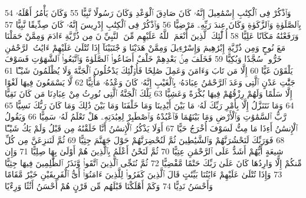 {\tiny\colorbox{cl_aya}{54}} وَٱذْكُرْ فِى ٱلْكِتَٰبِ إِسْمَٰعِيلَ إِنَّهُۥ كَانَ صَادِقَ ٱلْوَعْدِ وَكَانَ رَسُولًا نَّبِيًّا
{\tiny\colorbox{cl_aya}{55}} وَكَانَ يَأْمُرُ أَهْلَهُۥ بِٱلصَّلَوٰةِ وَٱلزَّكَوٰةِ وَكَانَ عِندَ رَبِّهِۦ مَرْضِيًّا
{\tiny\colorbox{cl_aya}{56}} وَٱذْكُرْ فِى ٱلْكِتَٰبِ إِدْرِيسَ إِنَّهُۥ كَانَ صِدِّيقًا نَّبِيًّا
{\tiny\colorbox{cl_aya}{57}} وَرَفَعْنَٰهُ مَكَانًا عَلِيًّا
{\tiny\colorbox{cl_aya}{58}} أُو۟لَٰٓئِكَ ٱلَّذِينَ أَنْعَمَ ٱللَّهُ عَلَيْهِم مِّنَ ٱلنَّبِيِّۦنَ مِن ذُرِّيَّةِ ءَادَمَ وَمِمَّنْ حَمَلْنَا مَعَ نُوحٍ وَمِن ذُرِّيَّةِ إِبْرَٰهِيمَ وَإِسْرَٰٓءِيلَ وَمِمَّنْ هَدَيْنَا وَٱجْتَبَيْنَآ إِذَا تُتْلَىٰ عَلَيْهِمْ ءَايَٰتُ ٱلرَّحْمَٰنِ خَرُّوا۟ سُجَّدًا وَبُكِيًّا
{\tiny\colorbox{cl_aya}{59}} فَخَلَفَ مِنۢ بَعْدِهِمْ خَلْفٌ أَضَاعُوا۟ ٱلصَّلَوٰةَ وَٱتَّبَعُوا۟ ٱلشَّهَوَٰتِ فَسَوْفَ يَلْقَوْنَ غَيًّا
{\tiny\colorbox{cl_aya}{60}} إِلَّا مَن تَابَ وَءَامَنَ وَعَمِلَ صَٰلِحًا فَأُو۟لَٰٓئِكَ يَدْخُلُونَ ٱلْجَنَّةَ وَلَا يُظْلَمُونَ شَيْـًٔا
{\tiny\colorbox{cl_aya}{61}} جَنَّٰتِ عَدْنٍ ٱلَّتِى وَعَدَ ٱلرَّحْمَٰنُ عِبَادَهُۥ بِٱلْغَيْبِ إِنَّهُۥ كَانَ وَعْدُهُۥ مَأْتِيًّا
{\tiny\colorbox{cl_aya}{62}} لَّا يَسْمَعُونَ فِيهَا لَغْوًا إِلَّا سَلَٰمًا وَلَهُمْ رِزْقُهُمْ فِيهَا بُكْرَةً وَعَشِيًّا
{\tiny\colorbox{cl_aya}{63}} تِلْكَ ٱلْجَنَّةُ ٱلَّتِى نُورِثُ مِنْ عِبَادِنَا مَن كَانَ تَقِيًّا
{\tiny\colorbox{cl_aya}{64}} وَمَا نَتَنَزَّلُ إِلَّا بِأَمْرِ رَبِّكَ لَهُۥ مَا بَيْنَ أَيْدِينَا وَمَا خَلْفَنَا وَمَا بَيْنَ ذَٰلِكَ وَمَا كَانَ رَبُّكَ نَسِيًّا
{\tiny\colorbox{cl_aya}{65}} رَّبُّ ٱلسَّمَٰوَٰتِ وَٱلْأَرْضِ وَمَا بَيْنَهُمَا فَٱعْبُدْهُ وَٱصْطَبِرْ لِعِبَٰدَتِهِۦ هَلْ تَعْلَمُ لَهُۥ سَمِيًّا
{\tiny\colorbox{cl_aya}{66}} وَيَقُولُ ٱلْإِنسَٰنُ أَءِذَا مَا مِتُّ لَسَوْفَ أُخْرَجُ حَيًّا
{\tiny\colorbox{cl_aya}{67}} أَوَلَا يَذْكُرُ ٱلْإِنسَٰنُ أَنَّا خَلَقْنَٰهُ مِن قَبْلُ وَلَمْ يَكُ شَيْـًٔا
{\tiny\colorbox{cl_aya}{68}} فَوَرَبِّكَ لَنَحْشُرَنَّهُمْ وَٱلشَّيَٰطِينَ ثُمَّ لَنُحْضِرَنَّهُمْ حَوْلَ جَهَنَّمَ جِثِيًّا
{\tiny\colorbox{cl_aya}{69}} ثُمَّ لَنَنزِعَنَّ مِن كُلِّ شِيعَةٍ أَيُّهُمْ أَشَدُّ عَلَى ٱلرَّحْمَٰنِ عِتِيًّا
{\tiny\colorbox{cl_aya}{70}} ثُمَّ لَنَحْنُ أَعْلَمُ بِٱلَّذِينَ هُمْ أَوْلَىٰ بِهَا صِلِيًّا
{\tiny\colorbox{cl_aya}{71}} وَإِن مِّنكُمْ إِلَّا وَارِدُهَا كَانَ عَلَىٰ رَبِّكَ حَتْمًا مَّقْضِيًّا
{\tiny\colorbox{cl_aya}{72}} ثُمَّ نُنَجِّى ٱلَّذِينَ ٱتَّقَوا۟ وَّنَذَرُ ٱلظَّٰلِمِينَ فِيهَا جِثِيًّا
{\tiny\colorbox{cl_aya}{73}} وَإِذَا تُتْلَىٰ عَلَيْهِمْ ءَايَٰتُنَا بَيِّنَٰتٍ قَالَ ٱلَّذِينَ كَفَرُوا۟ لِلَّذِينَ ءَامَنُوٓا۟ أَىُّ ٱلْفَرِيقَيْنِ خَيْرٌ مَّقَامًا وَأَحْسَنُ نَدِيًّا
{\tiny\colorbox{cl_aya}{74}} وَكَمْ أَهْلَكْنَا قَبْلَهُم مِّن قَرْنٍ هُمْ أَحْسَنُ أَثَٰثًا وَرِءْيًا
